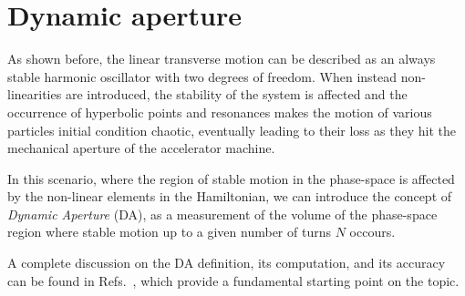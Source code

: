 \section{Dynamic aperture}

As shown before, the linear transverse motion can be described as an always stable harmonic oscillator with two degrees of freedom. When instead non-linearities are introduced, the stability of the system is affected and the occurrence of hyperbolic points and resonances makes the motion of various particles initial condition chaotic, eventually leading to their loss as they hit the mechanical aperture of the accelerator machine.

In this scenario, where the region of stable motion in the phase-space is affected by the non-linear elements in the Hamiltonian, we can introduce the concept of \textit{Dynamic Aperture} (DA), as a measurement of the volume of the phase-space region where stable motion up to a given number of turns $N$ occours.

A complete discussion on the DA definition, its computation, and its accuracy can be found in Refs.~\cite{todesco1996dynamic, giovannozzi1998dynamic}, which provide a fundamental starting point on the topic.

